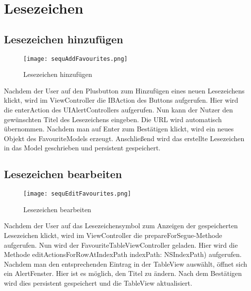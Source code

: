 \section{Lesezeichen}
\subsection{Lesezeichen hinzufügen}

\begin{figure}[ht]
	\centering
	\texttt{[image: sequAddFavourites.png]}
	\caption{Lesezeichen hinzufügen}
		\label{fig:Lesezeichen hinzufuegen}
\end{figure}
Nachdem der User auf den Plusbutton zum Hinzufügen eines neuen Lesezeichens klickt, wird im ViewController die IBAction des Buttons aufgerufen. Hier wird die enterAction des UIAlertControllers aufgerufen. Nun kann der Nutzer den gewünschten Titel des Lesezeichens eingeben. Die URL wird automatisch übernommen. Nachdem man auf Enter zum Bestätigen klickt, wird ein neues Objekt des FavouriteModels erzeugt. Anschließend wird das erstellte Lesezeichen in das Model geschrieben und persistent gespeichert.
\pagebreak

\subsection{Lesezeichen bearbeiten}
\begin{figure}[ht]
	\centering
	\texttt{[image: sequEditFavourites.png]}
	\caption{Lesezeichen bearbeiten}
	\label{fig: Lesezeichen bearbeiten}
\end{figure}
Nachdem der User auf das Lesezeichensymbol zum Anzeigen der gespeicherten Lesezeichen klickt, wird im ViewController die prepareForSegue-Methode aufgerufen. Nun wird der FavouriteTableViewController geladen. Hier wird die Methode editActionsForRowAtIndexPath indexPath: NSIndexPath) aufgerufen. Nachdem man den entsprechenden Eintrag in der TableView auswählt, öffnet sich ein AlertFenster. Hier ist es möglich, den Titel zu ändern. Nach dem Bestätigen wird dies persistent gespeichert und die TableView aktualisiert.
\pagebreak

